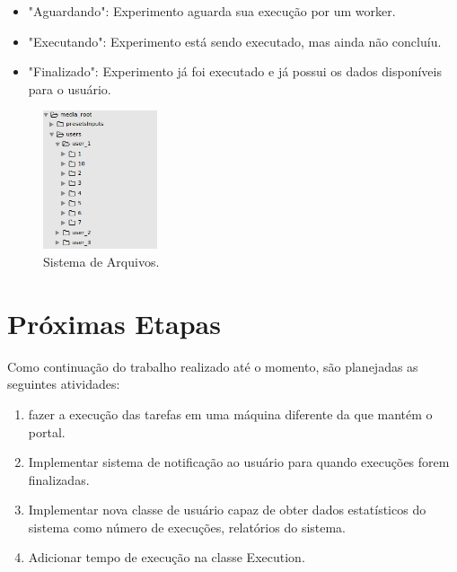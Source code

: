 \documentclass[tg]{mdtufsm}
\begin{document}
\begin{itemize}
	\item "Aguardando": Experimento aguarda sua execução por um worker.
	\item "Executando": Experimento está sendo executado, mas ainda não concluíu.
	\item "Finalizado": Experimento já foi executado e já possui os dados disponíveis para o usuário.
\end{itemize}
\begin{figure}
	\centering
	\includegraphics[width=0.3\textwidth]{filesystem}
	\caption{
		Sistema de Arquivos.
	}
	\label{fig:filesystem}
\end{figure}
\chapter{Próximas Etapas}

Como continuação do trabalho realizado até o momento, são planejadas as seguintes atividades:

\begin{enumerate}
	\item fazer a execução das tarefas em uma máquina diferente da que mantém o portal.
	\item Implementar sistema de notificação ao usuário para quando execuções forem finalizadas.
	\item Implementar nova classe de usuário capaz de obter dados estatísticos do sistema como número de execuções, relatórios do sistema.
	\item Adicionar tempo de execução na classe Execution.
\end{enumerate}

\setlength{\baselineskip}{\baselineskip}


\end{document}
